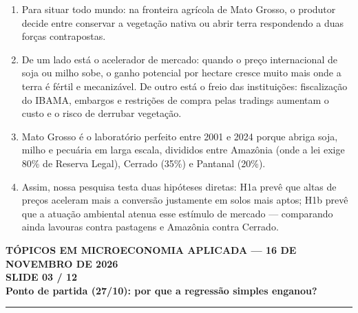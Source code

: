 \documentclass[11pt,a4paper]{article}
\newcommand{\slidenum}{1}
\begin{document}
\vspace{1mm}
\begin{enumerate}[leftmargin=*,label=\textbf{(\arabic*)},itemsep=2.6mm,topsep=1mm]
    \item Para situar todo mundo: na fronteira agrícola de Mato Grosso, o produtor decide entre conservar a vegetação nativa ou abrir terra respondendo a duas forças contrapostas.
    \item De um lado está o acelerador de mercado: quando o preço internacional de soja ou milho sobe, o ganho potencial por hectare cresce muito mais onde a terra é fértil e mecanizável. De outro está o freio das instituições: fiscalização do IBAMA, embargos e restrições de compra pelas tradings aumentam o custo e o risco de derrubar vegetação.
    \item Mato Grosso é o laboratório perfeito entre 2001 e 2024 porque abriga soja, milho e pecuária em larga escala, divididos entre Amazônia (onde a lei exige 80\% de Reserva Legal), Cerrado (35\%) e Pantanal (20\%).
    \item Assim, nossa pesquisa testa duas hipóteses diretas: H1a prevê que altas de preços aceleram mais a conversão justamente em solos mais aptos; H1b prevê que a atuação ambiental atenua esse estímulo de mercado — comparando ainda lavouras contra pastagens e Amazônia contra Cerrado.
\end{enumerate}

\newpage

\renewcommand{\slidenum}{3}
\noindent
\begin{minipage}{\textwidth}
\begin{center}
{\color{cinza}\footnotesize\textbf{TÓPICOS EM MICROECONOMIA APLICADA --- 16 DE NOVEMBRO DE 2026}\\[1.2mm]}
{\color{cinza}\bfseries\Large SLIDE 03 / 12\\[1.5mm]}
{\color{verde}\bfseries\LARGE Ponto de partida (27/10): por que a regressão simples enganou?\\[2.5mm]}
\rule{\textwidth}{1pt}
\end{center}
\end{minipage}
\vspace{1.5mm}
\end{document}
